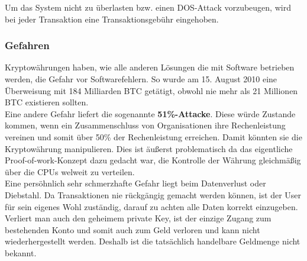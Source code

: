 Um das System nicht zu überlasten bzw. einen DOS-Attack vorzubeugen, wird bei jeder Transaktion eine Transaktionsgebühr eingehoben.

\subsubsection{Gefahren}
Kryptowährungen haben, wie alle anderen Lösungen die mit Software betrieben werden, die Gefahr vor Softwarefehlern. So wurde am 15. August 2010 eine Überweisung mit 184 Milliarden BTC getätigt, obwohl nie mehr als 21 Millionen BTC existieren sollten.\\

Eine andere Gefahr liefert die sogenannte \textbf{51\%-Attacke}. Diese würde Zustande kommen, wenn ein Zusammenschluss von Organisationen ihre Rechenleistung vereinen und somit über 50\% der Rechenleistung erreichen. Damit könnten sie die Kryptowährung manipulieren. Dies ist äußerst problematisch da das eigentliche Proof-of-work-Konzept dazu gedacht war, die Kontrolle der Währung gleichmäßig über die CPUs welweit zu verteilen.\\

Eine persöhnlich sehr schmerzhafte Gefahr liegt beim Datenverlust oder Diebstahl. Da Transaktionen nie rückgängig gemacht werden können, ist der User für sein eigenes Wohl zuständig, darauf zu achten alle Daten korrekt einzugeben. Verliert man auch den geheimem private Key, ist der einzige Zugang zum bestehenden Konto und somit auch zum Geld verloren und kann nicht wiederhergestellt werden. Deshalb ist die tatsächlich handelbare Geldmenge nicht bekannt.